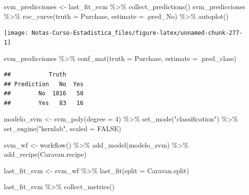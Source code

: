 \documentclass[
  12pt,
]{book}
\newenvironment{Shaded}{\begin{snugshade}}{\end{snugshade}}
\newcommand{\AttributeTok}[1]{\textcolor[rgb]{0.77,0.63,0.00}{#1}}
\newcommand{\ConstantTok}[1]{\textcolor[rgb]{0.00,0.00,0.00}{#1}}
\newcommand{\DecValTok}[1]{\textcolor[rgb]{0.00,0.00,0.81}{#1}}
\newcommand{\FunctionTok}[1]{\textcolor[rgb]{0.00,0.00,0.00}{#1}}
\newcommand{\NormalTok}[1]{#1}
\newcommand{\OtherTok}[1]{\textcolor[rgb]{0.56,0.35,0.01}{#1}}
\newcommand{\SpecialCharTok}[1]{\textcolor[rgb]{0.00,0.00,0.00}{#1}}
\newcommand{\StringTok}[1]{\textcolor[rgb]{0.31,0.60,0.02}{#1}}
\theoremstyle{definition}
\theoremstyle{definition}
\theoremstyle{definition}
\theoremstyle{definition}
\theoremstyle{remark}
\begin{document}
\begin{Shaded}
\begin{Highlighting}[]
\NormalTok{svm\_predicciones }\OtherTok{\textless{}{-}}\NormalTok{ last\_fit\_svm }\SpecialCharTok{\%\textgreater{}\%}
    \FunctionTok{collect\_predictions}\NormalTok{()}
\NormalTok{svm\_predicciones }\SpecialCharTok{\%\textgreater{}\%}
    \FunctionTok{roc\_curve}\NormalTok{(}\AttributeTok{truth =}\NormalTok{ Purchase, }\AttributeTok{estimate =}\NormalTok{ .pred\_No) }\SpecialCharTok{\%\textgreater{}\%}
    \FunctionTok{autoplot}\NormalTok{()}
\end{Highlighting}
\end{Shaded}

\begin{center}\texttt{[image: Notas-Curso-Estadistica\_files/figure-latex/unnamed-chunk-277-1]} \end{center}

\begin{Shaded}
\begin{Highlighting}[]
\NormalTok{svm\_predicciones }\SpecialCharTok{\%\textgreater{}\%}
    \FunctionTok{conf\_mat}\NormalTok{(}\AttributeTok{truth =}\NormalTok{ Purchase, }\AttributeTok{estimate =}\NormalTok{ .pred\_class)}
\end{Highlighting}
\end{Shaded}

\begin{verbatim}
##           Truth
## Prediction   No  Yes
##        No  1016   50
##        Yes   83   16
\end{verbatim}

\begin{Shaded}
\begin{Highlighting}[]
\NormalTok{modelo\_svm }\OtherTok{\textless{}{-}} \FunctionTok{svm\_poly}\NormalTok{(}\AttributeTok{degree =} \DecValTok{4}\NormalTok{) }\SpecialCharTok{\%\textgreater{}\%}
    \FunctionTok{set\_mode}\NormalTok{(}\StringTok{"classification"}\NormalTok{) }\SpecialCharTok{\%\textgreater{}\%}
    \FunctionTok{set\_engine}\NormalTok{(}\StringTok{"kernlab"}\NormalTok{, }\AttributeTok{scaled =} \ConstantTok{FALSE}\NormalTok{)}

\NormalTok{svm\_wf }\OtherTok{\textless{}{-}} \FunctionTok{workflow}\NormalTok{() }\SpecialCharTok{\%\textgreater{}\%}
    \FunctionTok{add\_model}\NormalTok{(modelo\_svm) }\SpecialCharTok{\%\textgreater{}\%}
    \FunctionTok{add\_recipe}\NormalTok{(Caravan.recipe)}

\NormalTok{last\_fit\_svm }\OtherTok{\textless{}{-}}\NormalTok{ svm\_wf }\SpecialCharTok{\%\textgreater{}\%}
    \FunctionTok{last\_fit}\NormalTok{(}\AttributeTok{split =}\NormalTok{ Caravan.split)}

\NormalTok{last\_fit\_svm }\SpecialCharTok{\%\textgreater{}\%}
    \FunctionTok{collect\_metrics}\NormalTok{()}
\end{Highlighting}
\end{Shaded}
\end{document}
